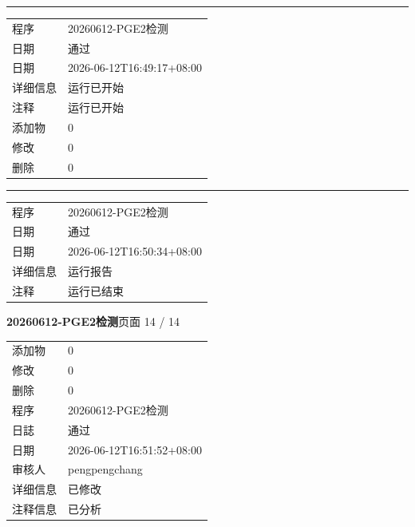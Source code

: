 \documentclass[UTF8,10pt,a4paper,fontset=fandol]{ctexart}
\newcommand{\fieldvalue}[1]{#1}
\begin{document}
\vspace{0.5em}
\hrule
\vspace{0.5em}

\begin{tabular}{@{}p{3.2cm}p{12cm}@{}}
程序 & 20260612-PGE2检测\\
日期 & 通过\\
日期 & 2026-06-12T16:49:17+08:00\\
详细信息 & 运行已开始\\
注释 & 运行已开始\\[2pt]
添加物 & 0\\
修改 & 0\\
删除 & 0
\end{tabular}

\vspace{0.5em}
\hrule
\vspace{0.5em}

\begin{tabular}{@{}p{3.2cm}p{12cm}@{}}
程序 & 20260612-PGE2检测\\
日期 & 通过\\
日期 & 2026-06-12T16:50:34+08:00\\
详细信息 & 运行报告\\
注释 & 运行已结束
\end{tabular}

\newpage

\noindent\textbf{20260612-PGE2检测}\hfill 页面 14 / 14

\vspace{1em}

\begin{tabular}{@{}l@{\quad}l@{}}
添加物 &
\fieldvalue{0} \\[2pt]
修改 &
\fieldvalue{0} \\[2pt]
删除 &
\fieldvalue{0} \\[6pt]
程序 &
\fieldvalue{20260612-PGE2检测} \\[2pt]
日誌 &
\fieldvalue{通过} \\[2pt]
日期 &
\fieldvalue{2026-06-12T16:51:52+08:00} \\[2pt]
审核人 &
\fieldvalue{pengpengchang} \\[2pt]
详细信息 &
\fieldvalue{已修改} \\[2pt]
注释信息 &
\fieldvalue{已分析}
\end{tabular}
\end{document}

